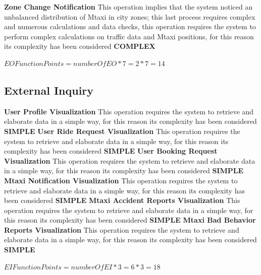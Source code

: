 \documentclass[11pt,titlepage]{article} %
\begin{document}
      
      
      \noindent \textbf{Zone Change Notification}\newline
      This operation implies that the system noticed an unbalanced distribution of Mtaxi in city zones; this last process requires complex and numerous
      calculations and data checks, this operation requires the system to perform complex calculations on traffic data and Mtaxi positions, for this reason its complexity has been considered \textbf{COMPLEX}\newline
      \begin{center}
	$ EO Function Points = numberOfEO * 7 = 2 * 7 = 14 $
      \end{center}
      
    \subsection{External Inquiry}
       \textbf{User Profile Visualization}\newline
       This operation requires the system to retrieve and elaborate data in a simple way, for this reason its complexity has been considered \textbf{SIMPLE}\newline\newline
       \textbf{User Ride Request Visualization}\newline
       This operation requires the system to retrieve and elaborate data in a simple way, for this reason its complexity has been considered \textbf{SIMPLE}\newline\newline
       \textbf{User Booking Request Visualization}\newline
       This operation requires the system to retrieve and elaborate data in a simple way, for this reason its complexity has been considered \textbf{SIMPLE}\newline\newline
       \textbf{Mtaxi Notification Visualization}\newline
       This operation requires the system to retrieve and elaborate data in a simple way, for this reason its complexity has been considered \textbf{SIMPLE}\newline\newline
       \textbf{Mtaxi Accident Reports Visualization}\newline
       This operation requires the system to retrieve and elaborate data in a simple way, for this reason its complexity has been considered \textbf{SIMPLE}\newline\newline
       \textbf{Mtaxi Bad Behavior Reports Visualization}\newline
       This operation requires the system to retrieve and elaborate data in a simple way, for this reason its complexity has been considered \textbf{SIMPLE}\newline
       \begin{center}
	$ EI Function Points = numberOfEI * 3 = 6 * 3 = 18 $
       \end{center}
     
\end{document}
